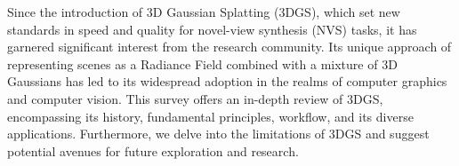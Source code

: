 Since the introduction of 3D Gaussian Splatting (3DGS), 
which set new standards in speed and quality for novel-view synthesis (NVS) tasks, 
it has garnered significant interest from the research community. 
Its unique approach of representing scenes as a Radiance Field combined with a mixture of 3D Gaussians 
has led to its widespread adoption in the realms of computer graphics and computer vision. 
This survey offers an in-depth review of 3DGS, 
encompassing its history, fundamental principles, workflow, and its diverse applications. 
Furthermore, we delve into the limitations of 3DGS and suggest potential avenues for future exploration and research.